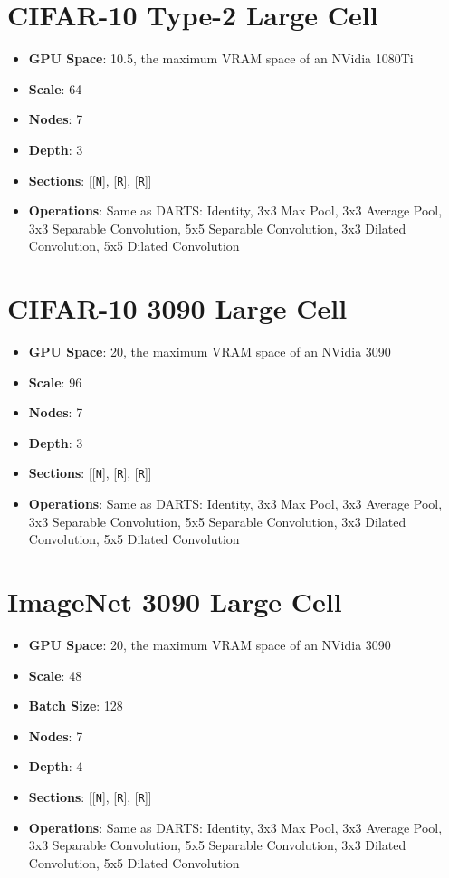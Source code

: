 \section{CIFAR-10 Type-2 Large Cell} \label{sect:type2_large_cell}
\begin{itemize}   \setlength\itemsep{-.2em}
	\item \textbf{GPU Space}: 10.5, the maximum VRAM space of an NVidia 1080Ti
	\item \textbf{Scale}: 64
	\item \textbf{Nodes}: 7
	\item \textbf{Depth}: 3
	\item \textbf{Sections}: [[\texttt{N}], [\texttt{R}], [\texttt{R}]]
	\item \textbf{Operations}: Same as DARTS: Identity, 3x3 Max Pool, 3x3 Average Pool, 3x3 Separable Convolution, 5x5 Separable Convolution,
	3x3 Dilated Convolution, 5x5 Dilated Convolution
\end{itemize}

\section{CIFAR-10 3090 Large Cell} \label{sect:3090_large_cell}
\begin{itemize}   \setlength\itemsep{-.2em}
	\item \textbf{GPU Space}: 20, the maximum VRAM space of an NVidia 3090
	\item \textbf{Scale}: 96
	\item \textbf{Nodes}: 7
	\item \textbf{Depth}: 3
	\item \textbf{Sections}: [[\texttt{N}], [\texttt{R}], [\texttt{R}]]
	\item \textbf{Operations}: Same as DARTS: Identity, 3x3 Max Pool, 3x3 Average Pool, 3x3 Separable Convolution, 5x5 Separable Convolution,
	3x3 Dilated Convolution, 5x5 Dilated Convolution
\end{itemize}

\section{ImageNet 3090 Large Cell} \label{sect:imagenet_large_cell}
\begin{itemize}   \setlength\itemsep{-.2em}
	\item \textbf{GPU Space}: 20, the maximum VRAM space of an NVidia 3090
	\item \textbf{Scale}: 48
	\item \textbf{Batch Size}: 128
	\item \textbf{Nodes}: 7
	\item \textbf{Depth}: 4
	\item \textbf{Sections}: [[\texttt{N}], [\texttt{R}], [\texttt{R}]]
	\item \textbf{Operations}: Same as DARTS: Identity, 3x3 Max Pool, 3x3 Average Pool, 3x3 Separable Convolution, 5x5 Separable Convolution,
	3x3 Dilated Convolution, 5x5 Dilated Convolution
\end{itemize}

